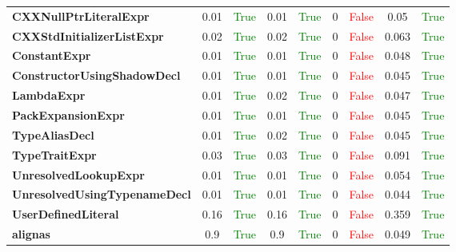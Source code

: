 \documentclass{article}
\begin{document}
\begin{xltabular}{\textwidth}{lcccccccc}
\textbf{{\fontsize{10}{12}\selectfont CXXNullPtrLiteralExpr}}& 0.01&\textcolor{green}{True}& 0.01&\textcolor{green}{True}& 0&\textcolor{red}{False}& 0.05&\textcolor{green}{True} \\[0.5ex]
\textbf{{\fontsize{10}{12}\selectfont CXXStdInitializerListExpr}}& 0.02&\textcolor{green}{True}& 0.02&\textcolor{green}{True}& 0&\textcolor{red}{False}& 0.063&\textcolor{green}{True} \\[0.5ex]
\textbf{{\fontsize{10}{12}\selectfont ConstantExpr}}& 0.01&\textcolor{green}{True}& 0.01&\textcolor{green}{True}& 0&\textcolor{red}{False}& 0.048&\textcolor{green}{True} \\[0.5ex]
\textbf{{\fontsize{10}{12}\selectfont ConstructorUsingShadowDecl}}& 0.01&\textcolor{green}{True}& 0.01&\textcolor{green}{True}& 0&\textcolor{red}{False}& 0.045&\textcolor{green}{True} \\[0.5ex]
\textbf{{\fontsize{10}{12}\selectfont LambdaExpr}}& 0.01&\textcolor{green}{True}& 0.02&\textcolor{green}{True}& 0&\textcolor{red}{False}& 0.047&\textcolor{green}{True} \\[0.5ex]
\textbf{{\fontsize{10}{12}\selectfont PackExpansionExpr}}& 0.01&\textcolor{green}{True}& 0.01&\textcolor{green}{True}& 0&\textcolor{red}{False}& 0.045&\textcolor{green}{True} \\[0.5ex]
\textbf{{\fontsize{10}{12}\selectfont TypeAliasDecl}}& 0.01&\textcolor{green}{True}& 0.02&\textcolor{green}{True}& 0&\textcolor{red}{False}& 0.045&\textcolor{green}{True} \\[0.5ex]
\textbf{{\fontsize{10}{12}\selectfont TypeTraitExpr}}& 0.03&\textcolor{green}{True}& 0.03&\textcolor{green}{True}& 0&\textcolor{red}{False}& 0.091&\textcolor{green}{True} \\[0.5ex]
\textbf{{\fontsize{10}{12}\selectfont UnresolvedLookupExpr}}& 0.01&\textcolor{green}{True}& 0.01&\textcolor{green}{True}& 0&\textcolor{red}{False}& 0.054&\textcolor{green}{True} \\[0.5ex]
\textbf{{\fontsize{10}{12}\selectfont UnresolvedUsingTypenameDecl}}& 0.01&\textcolor{green}{True}& 0.01&\textcolor{green}{True}& 0&\textcolor{red}{False}& 0.044&\textcolor{green}{True} \\[0.5ex]
\textbf{{\fontsize{10}{12}\selectfont UserDefinedLiteral}}& 0.16&\textcolor{green}{True}& 0.16&\textcolor{green}{True}& 0&\textcolor{red}{False}& 0.359&\textcolor{green}{True} \\[0.5ex]
\textbf{{\fontsize{10}{12}\selectfont alignas}}& 0.9&\textcolor{green}{True}& 0.9&\textcolor{green}{True}& 0&\textcolor{red}{False}& 0.049&\textcolor{green}{True} \\[0.5ex]

\end{xltabular}
\end{document}
